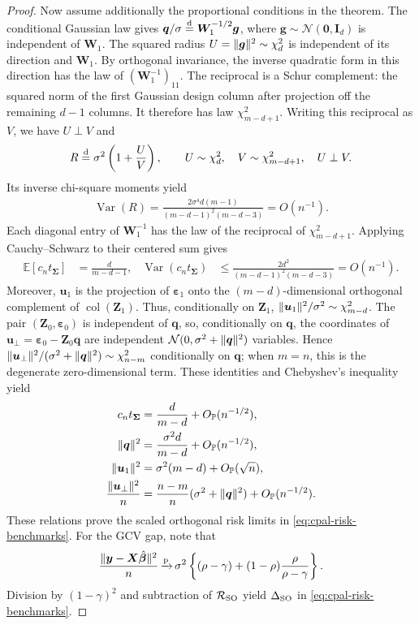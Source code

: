 \documentclass{article}
\theoremstyle{plain}
\theoremstyle{definition}
\theoremstyle{definition}
\newcommand{\boldzero}{\mathbf{0}}
\DeclarePairedDelimiter\norm{\lVert}{\rVert}
\newcommand{\limp}{{\,\smash{\xrightarrow{\mathrm{p}}}}\,}
\def\E{{\mathbb{E}}}
\def\P{{\mathbb{P}}}
\def\mathbold{\boldsymbol}
\def\cal{\mathcal}
\def\bg{\mathbold{g}}\def\ghat{\widehat{g}}\def\gtil{\widetilde{g}}
\def\bI{\mathbold{I}}\def\hbI{{\widehat{\bI}}}\def\tbI{{\widetilde{\bI}}}
\def\calN{{\cal N}}\def\scrN{{\mathscr N}}\def\Nhat{\widehat{N}}\def\Ntil{{\widetilde N}}\def\Nbar{{\overline N}}
\def\bq{\mathbold{q}}\def\qhat{\widehat{q}}\def\qtil{\widetilde{q}}\def\qbar{{\overline q}}
\def\calR{{\cal R}}\def\scrR{{\mathscr R}}\def\Rhat{\widehat{R}}\def\Rtil{{\widetilde R}}\def\Rbar{{\overline R}}
\def\bu{\mathbold{u}}\def\uhat{\widehat{u}}\def\util{\widetilde{u}}\def\ubar{{\overline u}}
\def\bW{\mathbold{W}}\def\hbW{{\widehat{\bW}}}\def\tbW{{\widetilde{\bW}}}
\def\bX{\mathbold{X}}\def\hbX{{\widehat{\bX}}}\def\tbX{{\tilde{\bX}}}\def\bXbar{{\overline \bX}}
\def\by{\mathbold{y}}\def\yhat{\widehat{y}}\def\ytil{\widetilde{y}}\def\ybar{{\overline y}}\def\vby{{\bf y}}
\def\bZ{\mathbold{Z}}\def\hbZ{{\widehat{\bZ}}}\def\tbZ{{\widetilde{\bZ}}}
\def\bbeta{\mathbold{\beta}}\def\betahat{\widehat{\beta}}\def\hbeta{\widehat{\beta}}
\def\hbbeta{\hat{\bbeta}{}}
\def\ep{\varepsilon}\def\eps{\epsilon}\def\veps{\varepsilon}
\def\bep{ {\mathbold{\ep} }}
\def\bSigma{\mathbold{\Sigma}}\def\hbSigma{{\widehat{\bSigma}}}
\begin{document}
\begin{proof}
Now assume additionally the proportional conditions in the theorem.
The conditional Gaussian law gives
$\bq/\sigma\stackrel{\rm d}{=}\bW_1^{-1/2}\bg$, where
$\bg\sim\calN(\boldzero,\bI_d)$ is independent of $\bW_1$.
The squared radius $U=\norm{\bg}^2\sim\chi^2_d$ is independent of its
direction and $\bW_1$. By orthogonal invariance, the inverse quadratic
form in this direction has the law of $(\bW_1^{-1})_{11}$.
The reciprocal is a Schur complement: the squared norm of the first
Gaussian design column after projection off the remaining $d-1$ columns.
It therefore has law $\chi^2_{m-d+1}$. Writing this reciprocal as $V$,
we have $U\perp V$ and
\begin{align*}
    R\stackrel{\rm d}{=}\sigma^2\left(1+\frac UV\right),
    \qquad U\sim\chi^2_d,\quad V\sim\chi^2_{m-d+1},
    \quad U\perp V.
\end{align*}
Its inverse chi-square moments yield
\begin{align*}
    \operatorname{Var}(R)
    =\frac{2\sigma^4d(m-1)}{(m-d-1)^2(m-d-3)}=O(n^{-1}).
\end{align*}
Each diagonal entry of $\bW_1^{-1}$ has the law of the reciprocal of
$\chi^2_{m-d+1}$. Applying Cauchy--Schwarz to their centered sum gives
\begin{align*}
    \E[c_nt_{\bSigma}]&=\frac{d}{m-d-1},
    &\operatorname{Var}(c_nt_{\bSigma})
      &\leq\frac{2d^2}{(m-d-1)^2(m-d-3)}=O(n^{-1}).
\end{align*}
Moreover, $\bu_1$ is the projection of $\bep_1$ onto the
$(m-d)$-dimensional orthogonal complement of
$\operatorname{col}(\bZ_1)$. Thus, conditionally on $\bZ_1$,
$\norm{\bu_1}^2/\sigma^2\sim\chi^2_{m-d}$.
The pair $(\bZ_0,\bep_0)$ is independent of $\bq$, so,
conditionally on $\bq$, the coordinates of
$\bu_\perp=\bep_0-\bZ_0\bq$ are independent
$\calN(0,\sigma^2+\norm{\bq}^2)$ variables. Hence
$\norm{\bu_\perp}^2/(\sigma^2+\norm{\bq}^2)\sim\chi^2_{n-m}$
conditionally on $\bq$; when $m=n$, this is the degenerate
zero-dimensional term.
These identities and Chebyshev's inequality yield
\begin{align*}
    c_nt_{\bSigma}&=\frac{d}{m-d}+O_{\P}(n^{-1/2}),\\
    \norm{\bq}^2&=\frac{\sigma^2d}{m-d}+O_{\P}(n^{-1/2}),\\
    \norm{\bu_1}^2&=\sigma^2(m-d)+O_{\P}(\sqrt n),\\
    \frac{\norm{\bu_\perp}^2}{n}
    &=\frac{n-m}{n}(\sigma^2+\norm{\bq}^2)
      +O_{\P}(n^{-1/2}).
\end{align*}
These relations prove the scaled orthogonal risk limits in
\eqref{eq:cpal-risk-benchmarks}. For the GCV gap,
note that
\begin{align*}
    \frac{\norm{\by-\bX\hbbeta}^2}{n}
    \limp
    \sigma^2\left\{(\rho-\gamma)
      +(1-\rho)\frac{\rho}{\rho-\gamma}\right\}.
\end{align*}
Division by $(1-\gamma)^2$ and subtraction of $\calR_{\rm SO}$
yield $\Delta_{\rm SO}$ in \eqref{eq:cpal-risk-benchmarks}.
\end{proof}
\end{document}
